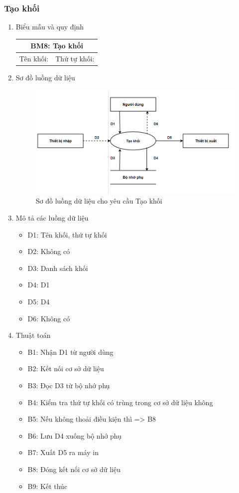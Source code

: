 \documentclass[a4paper]{article}
\begin{document}
			\subsubsection{Tạo khối}	
			\begin{enumerate}
\item Biểu mẫu và quy định
\begin{table}[H]
\centering
\renewcommand{\arraystretch}{1.5}
\setlength{\tabcolsep}{15pt}
\begin{tabular}{|p{5cm}|p{5cm}|}
\hline
\multicolumn{2}{|c|}{\textbf{BM8: Tạo khối}} \\
\hline
Tên khối: \dotfill & Thứ tự khối: \dotfill \\
\hline
\end{tabular}
\end{table}
\item Sơ đồ luồng dữ liệu

\begin{figure}[H] 
    \centering
    \includegraphics[width=1\textwidth]{dfd8} %
    \caption{Sơ đồ luồng dữ liệu cho yêu cầu Tạo khối}
\end{figure}

\item Mô tả các luồng dữ liệu
\begin{itemize}
\item D1: Tên khối, thứ tự khối
\item D2: Không có
\item D3: Danh sách khối
\item D4: D1
\item D5: D4
\item D6: Không có
\end{itemize}
\item Thuật toán
\begin{itemize}
\item B1: Nhận D1 từ người dùng
\item B2: Kết nối cơ sở dữ liệu
\item B3: Đọc D3 từ bộ nhớ phụ
\item B4: Kiểm tra thứ tự khối có trùng trong cơ sở dữ liệu không
\item B5: Nếu không thoải điều kiện thì => B8
\item B6: Lưu D4 xuống bộ nhớ phụ
\item B7: Xuất D5 ra máy in
\item B8: Đóng kết nối cơ sở dữ liệu
\item B9: Kết thúc
\end{itemize}
\end{enumerate}	
\end{document}
